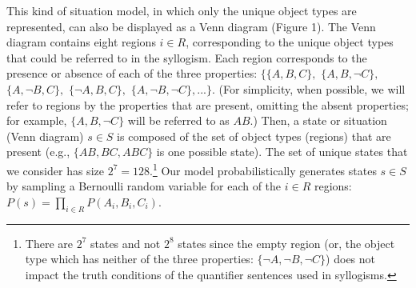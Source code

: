 \documentclass[floatsintext, doc]{apa6}
\begin{document}
This kind of situation model, in which only the unique object types are represented, can also be displayed as a Venn diagram (Figure 1).
The Venn diagram contains eight regions $i \in R$, corresponding to the unique object types that could be referred to in the syllogism. 
Each region corresponds to the presence or absence of each of the three properties: $\{\{A,B,C\},$ $\{A,B,\neg C\},$ $\{A,\neg B,C\},$ $\{\neg A, B, C\},$ $\{A, \neg B, \neg C\},...\}$. (For simplicity, when possible, we will refer to regions by the properties that are present, omitting the absent properties; for example, $\{A, B, \neg C\}$ will be referred to as $AB$.)
Then, a state or situation (Venn diagram) $s \in S$ is composed of the set of object types (regions) that are present (e.g., $\{AB, BC, ABC\}$ is one possible state).
The set of unique states that we consider has size $2^7 = 128$.\footnote{
There are $2^7$ states and not $2^8$ states since the empty region (or, the object type which has neither of the three properties: $\{\neg A, \neg B, \neg C\}$) does not impact the truth conditions of the quantifier sentences used in syllogisms.
}
Our model probabilistically generates states $s \in S$ by sampling a Bernoulli random variable for each of the $i \in R$ regions: $P(s) = \prod_{i \in R} P(A_{i}, B_{i}, C_{i})$. %
\end{document}
